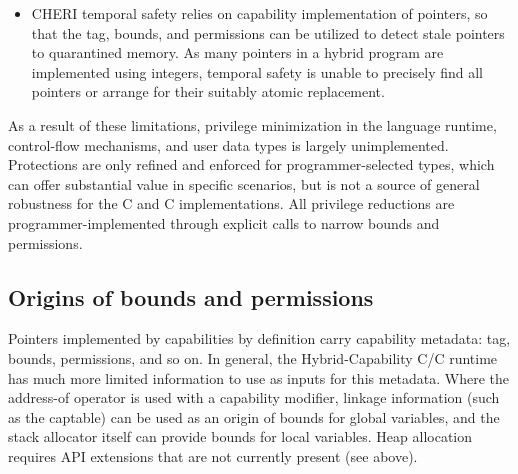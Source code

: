 \documentclass[12pt,twoside,openright,a4paper]{article}
\newcommand{\note}[2]{{\color{blue}[ Note: #1 - #2]}}
\renewcommand{\note}[2]{\relax\ifhmode\unskip\fi}
\newcommand{\psnote}[1]{\note{#1}{Peter S.}}
\newcommand{\nwfnote}[1]{\note{#1}{nwf}}
\newcommand{\dcnote}[1]{\note{#1}{David}}
\newcommand*{\cpp}{\texorpdfstring{C\textsmaller[2]{\protect\nolinebreak[4]\hspace{-.05em}\raisebox{.45ex}{\textbf{++}}}}{C++}}
\newcommand*{\COrCpp}{C/\cpp{}}
\newcommand*{\hybridCOrCpp}{Hybrid-Capability \COrCpp{}}
\begin{document}
\begin{itemize}
\item CHERI temporal safety relies on capability implementation of pointers,
  so that the tag, bounds, and permissions can be utilized to detect stale
  pointers to quarantined memory.
  As many pointers in a hybrid program are implemented using integers,
  temporal safety is unable to precisely find all pointers or arrange for
  their suitably atomic replacement.
  \dcnote{I think I'd phrase this slightly differently.  From the perspective
    of revocation, DDC (which encompases the C heap, stack, and image), is a
    single object and so no object reachable from the hybrid heap / stack /
    globals will ever be revoked.}
  \nwfnote{Well, a capability held within DDC that points to a revokable IPC
    object (i.e., an object not within DDC) is still subject to revocation
    as per usual.  I'd phrase it as ``subobjects of DDC'' will not be revoked
    soundly even if revocation is attempted.  In a sense DDC and the
    VMMAP-bearing caps handed to malloc are analogous here: malloc would be
    free (hah) to reconstruct a pointer to a free/revoked region incorrectly,
    but we (endeavour to) ensure that it doesn't.}
\end{itemize}

As a result of these limitations, privilege minimization in the language
runtime, control-flow mechanisms, and user data types is largely unimplemented.
Protections are only refined and enforced for programmer-selected types, which
can offer substantial value in specific scenarios, but is not a source of
general robustness for the C and \cpp{} implementations.
All privilege reductions are programmer-implemented through explicit calls to
narrow bounds and permissions.

\subsection{Origins of bounds and permissions}

Pointers implemented by capabilities by definition carry capability metadata:
tag, bounds, permissions, and so on.
In general, the \hybridCOrCpp{} runtime has much more limited information to
use as inputs for this metadata.
\psnote{...than pure-capability CHERI C/C++ (hmm -- maybe it's worth still keeping the ``pure'' terminology for this document, to make such oppositions clear?)}
Where the address-of operator is used with a capability modifier, linkage
information (such as the captable) can be used as an origin of bounds for
global variables, and the stack allocator itself can provide bounds for local
variables.
Heap allocation requires API extensions that are not currently present (see
above).
\end{document}
